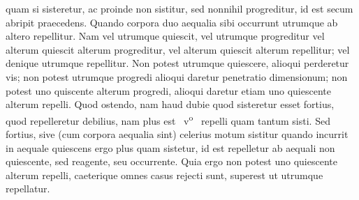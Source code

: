 %
quam si sisteretur,\protect{}
ac proinde non sistitur,
sed nonnihil progreditur,
id est secum abripit praecedens.%
\pend%
%
\pstart%
Quando corpora duo aequalia sibi occurrunt%
\protect{}
utrumque ab altero repellitur.%
\protect{}
Nam
%
%
vel utrumque quiescit,%
\protect{}
vel utrumque progreditur%
\protect{}
vel alterum quiescit alterum progreditur,
vel alterum quiescit alterum repellitur;%
\protect{}
vel denique utrumque repellitur.
Non potest utrumque quiescere,
alioqui perderetur vis;%
\protect{}
non potest utrumque progredi
alioqui daretur penetratio dimensionum;%
\protect{}
non potest uno quiscente alterum progredi,
alioqui daretur etiam
%
%
uno quiescente alterum repelli.%
\protect{}%
\protect{}
Quod ostendo,
nam haud dubie
quod sisteretur esset fortius,%
\protect{}
quod repelleretur debilius,%
\protect{}
nam plus est
%
~v\textsuperscript{o}\rbrack\
%
repelli quam tantum sisti.%
\protect{}
Sed fortius,
sive (cum corpora aequalia sint)
celerius motum sistitur
quando incurrit in aequale quiescens
%
%
ergo plus quam sistetur,
id est repelletur ab aequali non quiescente,
sed reagente,\protect{}
seu occurrente.\protect{}
Quia ergo non potest uno quiescente%
\protect{}
alterum repelli,
caeterique omnes casus rejecti sunt,%
\protect{}
superest ut utrumque repellatur.%
